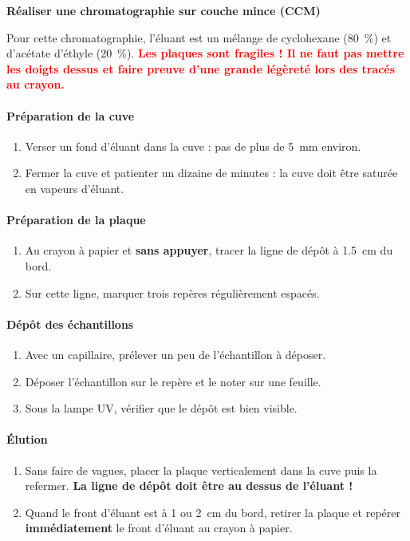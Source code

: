 \documentclass[12pt,a4paper,fleqn]{article}
\begin{document}
\begin{doc}
\textbf{Réaliser une chromatographie sur couche mince (CCM)}

Pour cette chromatographie, l'éluant est un mélange de cyclohexane (\qty{80}{\percent}) et d'acétate d'éthyle (\qty{20}{\percent}).
\textbf{\textcolor{red}{Les plaques sont fragiles ! Il ne faut pas mettre les doigts dessus et faire  preuve d'une grande légèreté lors des tracés au crayon.}}
\begin{multicols}{2}
\paragraph{Préparation de la cuve}
\begin{enumerate}
\item Verser un fond d'éluant dans la cuve : pas de plus de \qty{5}{mm} environ.
\item Fermer la cuve et patienter un dizaine de minutes : la cuve doit être saturée en vapeurs d'éluant.
\end{enumerate}
\paragraph{Préparation de la plaque}
\begin{enumerate}[resume]
\item Au crayon à papier et \textbf{sans appuyer}, tracer la ligne de dépôt à \qty{1,5}{cm} du bord.
\item Sur cette ligne, marquer trois repères régulièrement espacés.
\end{enumerate}
\paragraph{Dépôt des échantillons}
\begin{enumerate}[resume]
\item Avec un capillaire, prélever un peu de l'échantillon à déposer.
\item Déposer l'échantillon sur le repère et le noter sur une feuille.
\item Sous la lampe UV, vérifier que le dépôt est bien visible.
\end{enumerate}
\paragraph{Élution}
\begin{enumerate}[resume]
\item Sans faire de vagues, placer la plaque verticalement dans la cuve puis la refermer.
\textbf{La ligne de dépôt doit être au dessus de l'éluant !}
\item Quand le front d'éluant est à \num{1} ou \qty{2}{cm} du bord, retirer la plaque et repérer \textbf{immédiatement} le front d'éluant au crayon à papier.
\end{enumerate}

\end{multicols}
\end{doc}
\end{document}
